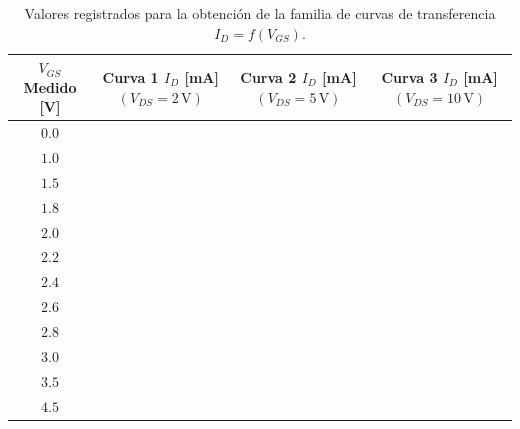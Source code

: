 \begin{table}[H]
    \centering
    \caption{Valores registrados para la obtención de la familia de curvas de transferencia $I_D=f(V_{GS})$.}
    \label{tab:curvas_transferencia}

    \begin{tabular}{|c|c|c|c|}
        \hline
        \shortstack{$V_{GS}$\\Medido [V]}&
        \shortstack{Curva 1\\
        $I_D$ [mA] $(V_{DS}=2\,\mathrm{V})$} &
        \shortstack{Curva 2\\
        $I_D$ [mA] $(V_{DS}=5\,\mathrm{V})$} &
        \shortstack{Curva 3\\
        $I_D$ [mA] $(V_{DS}=10\,\mathrm{V})$} \\
        \hline
        
        $0.0$ & & & \\ \hline
        $1.0$ & & & \\ \hline
        $1.5$ & & & \\ \hline
        $1.8$ & & & \\ \hline
        $2.0$ & & & \\ \hline
        $2.2$ & & & \\ \hline
        $2.4$ & & & \\ \hline
        $2.6$ & & & \\ \hline
        $2.8$ & & & \\ \hline
        $3.0$ & & & \\ \hline
        $3.5$ & & & \\ \hline
        $4.5$ & & & \\ \hline
        
    \end{tabular}
\end{table}




